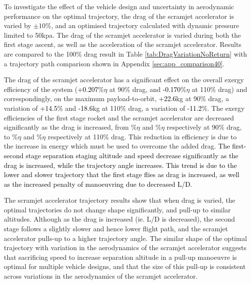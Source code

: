 \noindent
To investigate the effect of the vehicle design and uncertainty in aerodynamic performance on the optimal trajectory, the drag of the scramjet accelerator is varied by $\pm10$\%, and an optimised trajectory calculated with dynamic pressure limited to 50kpa. The drag of the scramjet accelerator is varied during both the first stage ascent, as well as the acceleration of the scramjet accelerator. Results are compared to the 100\% drag result in Table \ref{tab:DragVariationNoReturn} with a trajectory path comparison shown in Appendix \ref{sec:app_comparison40}. 

The drag of the scramjet accelerator has a significant effect on the overall exergy efficiency of the system (\textcolor{black}{+0.207}\%$\eta$ at 90\% drag, and \textcolor{black}{-0.170}\%$\eta$ at 110\% drag) and correspondingly, on the maximum payload-to-orbit, \textcolor{black}{+22.6}kg at 90\% drag, a variation of \textcolor{black}{+14.5}\% and \textcolor{black}{-18.6}kg at 110\% drag, a variation of \textcolor{black}{-11.2}\%. The exergy efficiencies of the first stage rocket and the scramjet accelerator are decreased significantly as the drag is increased, from \firstExergyEffCdNinetyNoReturn\%$\eta$ and \secondExergyEffCdNinetyNoReturn\%$\eta$ respectively at 90\% drag, to \firstExergyEffCdOneHundredTenNoReturn\%$\eta$ and \secondExergyEffCdOneHundredTenNoReturn\%$\eta$ respectively at 110\% drag. This reduction in efficiency is due to the increase in energy which must be used to overcome the added drag. 
\textcolor{black}{
The first-second stage separation staging altitude and speed decrease significantly as the drag is increased, while the trajectory angle increases. This trend is due to the lower and slower trajectory that the first stage flies as drag is increased, as well as the increased penalty of manoeuvring due to decreased L/D. }


The scramjet accelerator trajectory results show that when drag is varied, the optimal trajectories do not change shape significantly, and pull-up to similar altitudes. Although as the drag is increased (ie. L/D is decreased), the second stage follows a slightly slower and hence lower flight path, and the scramjet accelerator pulls-up to a higher trajectory angle. The similar shape of the optimal trajectory with variation in the aerodynamics of the scramjet accelerator suggests that sacrificing speed to increase separation altitude in a pull-up manoeuvre is optimal for multiple vehicle designs, and that the size of this pull-up is consistent across variations in the aerodynamics of the scramjet accelerator. 

